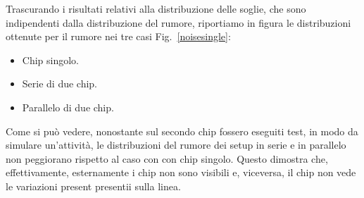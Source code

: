 Trascurando i risultati relativi alla distribuzione delle soglie, che sono indipendenti dalla distribuzione del rumore, riportiamo in figura le distribuzioni ottenute per il rumore nei tre casi Fig.~\ref{noisesingle}:
\begin{itemize}
\item Chip singolo.
\item Serie di due chip.
\item Parallelo di due chip.
\end{itemize}
Come si può vedere, nonostante sul secondo chip fossero eseguiti test, in modo da simulare un'attività, le distribuzioni del rumore dei setup in serie e in parallelo non peggiorano rispetto al caso con con chip singolo.
Questo dimostra che, effettivamente, esternamente i chip non sono visibili e, viceversa, il chip non vede le variazioni present presentii sulla linea.


